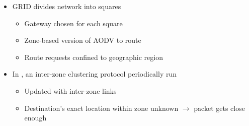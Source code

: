 \documentclass[pdftex]{beamer}
\begin{document}
\begin{frame}
	\begin{itemize}
		\item GRID \cite{Liao01grid:a} divides network into squares
		\begin{itemize}
			\item Gateway chosen for each square
			\item Zone-based version of AODV to route
			\item Route requests confined to geographic region
		\end{itemize}
		\item In \cite{779923}, an inter-zone clustering protocol periodically run
		\begin{itemize}
			\item Updated with inter-zone links
			\item Destination's exact location within zone unknown $\rightarrow$ packet gets close enough
		\end{itemize}	
	\end{itemize}
\end{frame}
\end{document}
